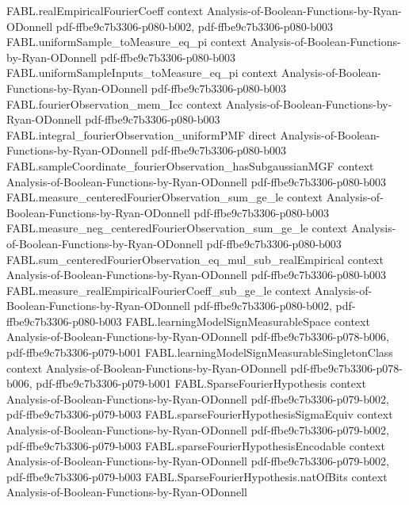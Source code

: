 \begin{theorem}
\proofstep
  {FABL.realEmpiricalFourierCoeff}
  {context}
  {Analysis-of-Boolean-Functions-by-Ryan-ODonnell}
  {pdf-ffbe9c7b3306-p080-b002,
    pdf-ffbe9c7b3306-p080-b003}
\proofstep
  {FABL.uniformSample_toMeasure_eq_pi}
  {context}
  {Analysis-of-Boolean-Functions-by-Ryan-ODonnell}
  {pdf-ffbe9c7b3306-p080-b003}
\proofstep
  {FABL.uniformSampleInputs_toMeasure_eq_pi}
  {context}
  {Analysis-of-Boolean-Functions-by-Ryan-ODonnell}
  {pdf-ffbe9c7b3306-p080-b003}
\proofstep
  {FABL.fourierObservation_mem_Icc}
  {context}
  {Analysis-of-Boolean-Functions-by-Ryan-ODonnell}
  {pdf-ffbe9c7b3306-p080-b003}
\proofstep
  {FABL.integral_fourierObservation_uniformPMF}
  {direct}
  {Analysis-of-Boolean-Functions-by-Ryan-ODonnell}
  {pdf-ffbe9c7b3306-p080-b003}
\proofstep
  {FABL.sampleCoordinate_fourierObservation_hasSubgaussianMGF}
  {context}
  {Analysis-of-Boolean-Functions-by-Ryan-ODonnell}
  {pdf-ffbe9c7b3306-p080-b003}
\proofstep
  {FABL.measure_centeredFourierObservation_sum_ge_le}
  {context}
  {Analysis-of-Boolean-Functions-by-Ryan-ODonnell}
  {pdf-ffbe9c7b3306-p080-b003}
\proofstep
  {FABL.measure_neg_centeredFourierObservation_sum_ge_le}
  {context}
  {Analysis-of-Boolean-Functions-by-Ryan-ODonnell}
  {pdf-ffbe9c7b3306-p080-b003}
\proofstep
  {FABL.sum_centeredFourierObservation_eq_mul_sub_realEmpirical}
  {context}
  {Analysis-of-Boolean-Functions-by-Ryan-ODonnell}
  {pdf-ffbe9c7b3306-p080-b003}
\proofstep
  {FABL.measure_realEmpiricalFourierCoeff_sub_ge_le}
  {context}
  {Analysis-of-Boolean-Functions-by-Ryan-ODonnell}
  {pdf-ffbe9c7b3306-p080-b002,
    pdf-ffbe9c7b3306-p080-b003}
\proofstep
  {FABL.learningModelSignMeasurableSpace}
  {context}
  {Analysis-of-Boolean-Functions-by-Ryan-ODonnell}
  {pdf-ffbe9c7b3306-p078-b006,
    pdf-ffbe9c7b3306-p079-b001}
\proofstep
  {FABL.learningModelSignMeasurableSingletonClass}
  {context}
  {Analysis-of-Boolean-Functions-by-Ryan-ODonnell}
  {pdf-ffbe9c7b3306-p078-b006,
    pdf-ffbe9c7b3306-p079-b001}
\proofstep
  {FABL.SparseFourierHypothesis}
  {context}
  {Analysis-of-Boolean-Functions-by-Ryan-ODonnell}
  {pdf-ffbe9c7b3306-p079-b002,
    pdf-ffbe9c7b3306-p079-b003}
\proofstep
  {FABL.sparseFourierHypothesisSigmaEquiv}
  {context}
  {Analysis-of-Boolean-Functions-by-Ryan-ODonnell}
  {pdf-ffbe9c7b3306-p079-b002,
    pdf-ffbe9c7b3306-p079-b003}
\proofstep
  {FABL.sparseFourierHypothesisEncodable}
  {context}
  {Analysis-of-Boolean-Functions-by-Ryan-ODonnell}
  {pdf-ffbe9c7b3306-p079-b002,
    pdf-ffbe9c7b3306-p079-b003}
\proofstep
  {FABL.SparseFourierHypothesis.natOfBits}
  {context}
  {Analysis-of-Boolean-Functions-by-Ryan-ODonnell}

\end{theorem}

